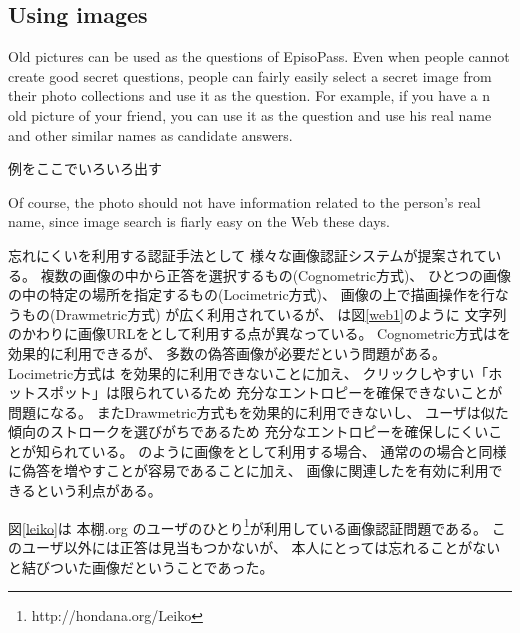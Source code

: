 \documentclass{article}
\begin{document}
\subsection{Using images}

Old pictures can be used as the questions of EpisoPass.
Even when people cannot create good secret questions,
people can fairly easily select a secret image from their photo collections
and use it as the question.
For example, if you have a n old picture of your friend,
you can use it as the question
and use his real name and other similar names as candidate answers.

例をここでいろいろ出す


Of course, the photo should not have information related to the
person's real name, since image search is fiarly easy on the Web these days.

忘れにくい{\EM}を利用する認証手法として
様々な画像認証システム\cite{Biddle:2012:GPL:2333112.2333114}\cite{GraphicalPasswords}\cite{小池英樹:2006-05-15}が提案されている。
複数の画像の中から正答を選択するもの(Cognometric方式)、
ひとつの画像の中の特定の場所を指定するもの(Locimetric方式)、
画像の上で描画操作を行なうもの(Drawmetric方式)
が広く利用されているが\cite{Biddle:2012:GPL:2333112.2333114}\cite{GraphicalPasswords}\cite{Guideline}、
{\EP}は図\ref{web1}のように
文字列のかわりに画像URLを{\SQ}として利用する点が異なっている。
%
Cognometric方式は{\EM}を効果的に利用できるが、
多数の偽答画像が必要だという問題がある。
Locimetric方式は
{\EM}を効果的に利用できないことに加え、
クリックしやすい「ホットスポット」は限られているため
充分なエントロピーを確保できないことが問題になる\cite{Dirik:2007:MUC:1280680.1280684}。
またDrawmetric方式も{\EM}を効果的に利用できないし、
ユーザは似た傾向のストロークを選びがちであるため
充分なエントロピーを確保しにくいことが知られている\cite{Nali}。
%
{\EP}のように画像を{\SQ}として利用する場合、
通常の{\SQ}の場合と同様に偽答を増やすことが容易であることに加え、
画像に関連した{\EM}を有効に利用できるという利点がある\cite{増井:CSS}。

図\ref{leiko}は
本棚.org\cite{hondana}\cite{hondanaorg}
のユーザのひとり\footnote{
  \textsf{http://hondana.org/Leiko}
}が利用している画像認証問題である。
このユーザ以外には正答は見当もつかないが、
本人にとっては忘れることがない{\EM}と結びついた画像だということであった。

% 
% 
% 
%
\end{document}
